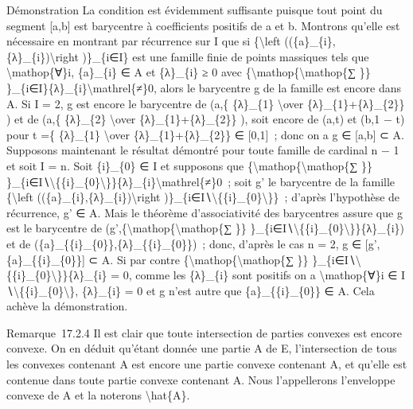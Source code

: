 \documentclass[]{article}
\begin{document}
Démonstration La condition est évidemment suffisante puisque tout point
du segment {[}a,b{]} est barycentre à coefficients positifs de a et b.
Montrons qu'elle est nécessaire en montrant par récurrence sur
\textbar{}I\textbar{} que si \{\textbackslash{}left
((\{a\}\_\{i\},\{λ\}\_\{i\})\textbackslash{}right )\}\_\{i∈I\} est une
famille finie de points massiques tels que \textbackslash{}mathop\{∀\}i,
\{a\}\_\{i\} ∈ A et \{λ\}\_\{i\} ≥ 0 avec
\{\textbackslash{}mathop\{\textbackslash{}mathop\{∑ \}\}
\}\_\{i∈I\}\{λ\}\_\{i\}\textbackslash{}mathrel\{≠\}0, alors le
barycentre g de la famille est encore dans A. Si \textbar{}I\textbar{} =
2, g est encore le barycentre de (a,\{ \{λ\}\_\{1\} \textbackslash{}over
\{λ\}\_\{1\}+\{λ\}\_\{2\}\} ) et de (a,\{ \{λ\}\_\{2\}
\textbackslash{}over \{λ\}\_\{1\}+\{λ\}\_\{2\}\} ), soit encore de (a,t)
et (b,1 − t) pour t =\{ \{λ\}\_\{1\} \textbackslash{}over
\{λ\}\_\{1\}+\{λ\}\_\{2\}\} ∈ {[}0,1{]}~; donc on a g ∈ {[}a,b{]} ⊂ A.
Supposons maintenant le résultat démontré pour toute famille de cardinal
n − 1 et soit \textbar{}I\textbar{} = n. Soit \{i\}\_\{0\} ∈ I et
supposons que \{\textbackslash{}mathop\{\textbackslash{}mathop\{∑ \}\}
\}\_\{i∈I∖\textbackslash{}\{\{i\}\_\{0\}\textbackslash{}\}\}\{λ\}\_\{i\}\textbackslash{}mathrel\{≠\}0~;
soit g' le barycentre de la famille \{\textbackslash{}left
((\{a\}\_\{i\},\{λ\}\_\{i\})\textbackslash{}right
)\}\_\{i∈I∖\textbackslash{}\{\{i\}\_\{0\}\textbackslash{}\}\}~; d'après
l'hypothèse de récurrence, g' ∈ A. Mais le théorème d'associativité des
barycentres assure que g est le barycentre de
(g',\{\textbackslash{}mathop\{\textbackslash{}mathop\{∑ \}\}
\}\_\{i∈I∖\textbackslash{}\{\{i\}\_\{0\}\textbackslash{}\}\}\{λ\}\_\{i\})
et de (\{a\}\_\{\{i\}\_\{0\}\},\{λ\}\_\{\{i\}\_\{0\}\})~; donc, d'après
le cas n = 2, g ∈ {[}g',\{a\}\_\{\{i\}\_\{0\}\}{]} ⊂ A. Si par contre
\{\textbackslash{}mathop\{\textbackslash{}mathop\{∑ \}\}
\}\_\{i∈I∖\textbackslash{}\{\{i\}\_\{0\}\textbackslash{}\}\}\{λ\}\_\{i\}
= 0, comme les \{λ\}\_\{i\} sont positifs on a
\textbackslash{}mathop\{∀\}i ∈ I
∖\textbackslash{}\{\{i\}\_\{0\}\textbackslash{}\}, \{λ\}\_\{i\} = 0 et g
n'est autre que \{a\}\_\{\{i\}\_\{0\}\} ∈ A. Cela achève la
démonstration.

Remarque~17.2.4 Il est clair que toute intersection de parties convexes
est encore convexe. On en déduit qu'étant donnée une partie A de E,
l'intersection de tous les convexes contenant A est encore une partie
convexe contenant A, et qu'elle est contenue dans toute partie convexe
contenant A. Nous l'appellerons l'enveloppe convexe de A et la noterons
\textbackslash{}hat\{A\}.
\end{document}
